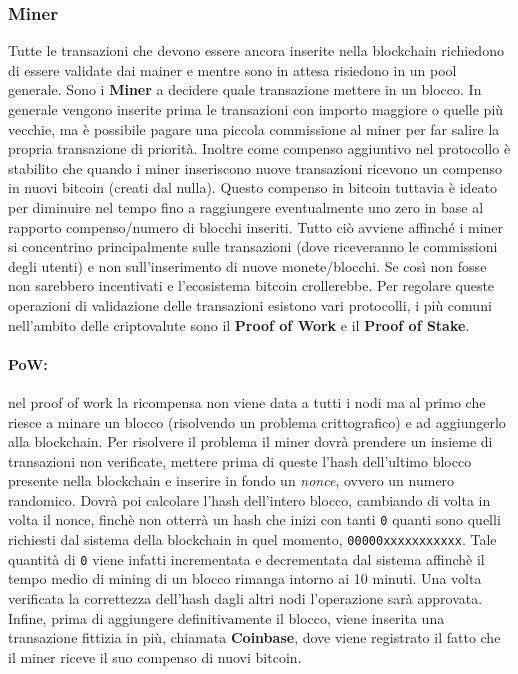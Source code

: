 \subsubsection{Miner}

Tutte le transazioni che devono essere ancora inserite nella blockchain
richiedono di essere validate dai mainer e mentre sono in attesa risiedono in un
pool generale. Sono i \textbf{Miner} a decidere quale transazione mettere in un
blocco. In generale vengono inserite prima le transazioni con importo maggiore o
quelle più vecchie, ma è possibile pagare una piccola commissione al miner per
far salire la propria transazione di priorità. Inoltre come compenso aggiuntivo
nel protocollo è stabilito che quando i miner inseriscono nuove transazioni
ricevono un compenso in nuovi bitcoin (creati dal nulla). Questo compenso in
bitcoin tuttavia è ideato per diminuire nel tempo fino a raggiungere
eventualmente uno zero in base al rapporto compenso/numero di blocchi inseriti.
Tutto ciò avviene affinché i miner si concentrino principalmente sulle
transazioni (dove riceveranno le commissioni degli utenti) e non
sull'inserimento di nuove monete/blocchi. Se così non fosse non sarebbero
incentivati e l'ecosistema bitcoin crollerebbe.
Per regolare queste operazioni di validazione delle transazioni esistono vari
protocolli, i più comuni nell'ambito delle criptovalute sono il \textbf{Proof of
    Work} e il \textbf{Proof of Stake}.

\paragraph{PoW:}
nel proof of work la ricompensa non viene data a tutti i nodi ma al primo che riesce a minare un blocco (risolvendo un problema crittografico) e ad aggiungerlo alla blockchain. Per risolvere il problema il
miner dovrà prendere un insieme di transazioni non verificate, mettere prima di queste l'hash dell'ultimo blocco presente nella blockchain e inserire in fondo un \emph{nonce}, ovvero un numero randomico. Dovrà poi calcolare l'hash dell'intero blocco, cambiando di volta in volta il nonce, finchè non otterrà un hash che inizi con tanti \verb|0| quanti sono quelli richiesti dal sistema della blockchain in quel momento, \verb|00000xxxxxxxxxxx|. Tale quantità di \verb|0| viene infatti incrementata e decrementata dal sistema affinchè il tempo medio di mining di un blocco rimanga intorno ai 10 minuti. Una volta
verificata la correttezza dell'hash dagli altri nodi l'operazione sarà approvata. Infine, prima di aggiungere definitivamente il blocco, viene inserita una transazione fittizia in più, chiamata \textbf{Coinbase}, dove viene registrato il fatto che il miner riceve il suo compenso di nuovi bitcoin.

